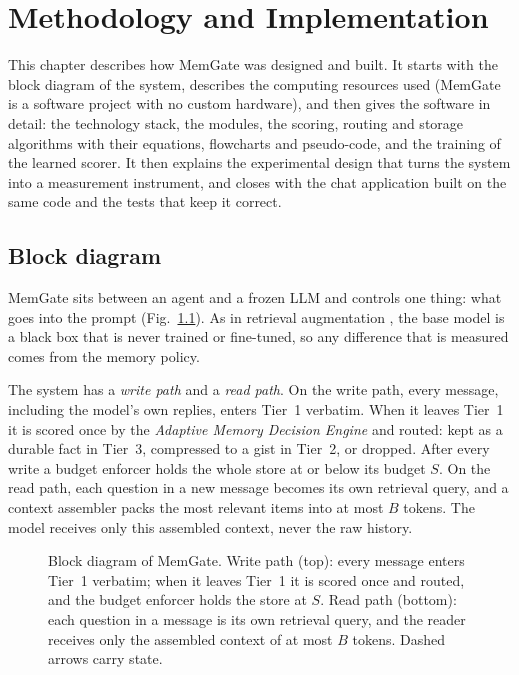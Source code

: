 \chapter{Methodology and Implementation}
\label{ch:method}

This chapter describes how MemGate was designed and built. It starts with the
block diagram of the system, describes the computing resources used (MemGate
is a software project with no custom hardware), and then gives the software in
detail: the technology stack, the modules, the scoring, routing and storage
algorithms with their equations, flowcharts and pseudo-code, and the training
of the learned scorer. It then explains the experimental design that turns the
system into a measurement instrument, and closes with the chat application
built on the same code and the tests that keep it correct.

\section{Block diagram}
\label{sec:harness}

MemGate sits between an agent and a frozen LLM and controls one thing: what
goes into the prompt (Fig.~\ref{fig:arch}). As in retrieval augmentation
\cite{lewis2020rag}, the base model is a black box that is never trained or
fine-tuned, so any difference that is measured comes from the memory policy.

The system has a \emph{write path} and a \emph{read path}. On the write path,
every message, including the model's own replies, enters Tier~1 verbatim.
When it leaves Tier~1 it is scored once by the \emph{Adaptive Memory Decision
Engine} and routed: kept as a durable fact in Tier~3, compressed to a gist in
Tier~2, or dropped. After every write a budget enforcer holds the whole store
at or below its budget $S$. On the read path, each question in a new message
becomes its own retrieval query, and a context assembler packs the most
relevant items into at most $B$ tokens. The model receives only this
assembled context, never the raw history.

\begin{figure}
\centering
\resizebox{\textheight}{!}{}
\caption[Block diagram of MemGate.]{Block diagram of MemGate. Write path (top): every message enters
Tier~1 verbatim; when it leaves Tier~1 it is scored once and routed, and the
budget enforcer holds the store at $S$. Read path (bottom): each question in a
message is its own retrieval query, and the reader receives only the assembled
context of at most $B$ tokens. Dashed arrows carry state.}
\label{fig:arch}
\end{figure}

